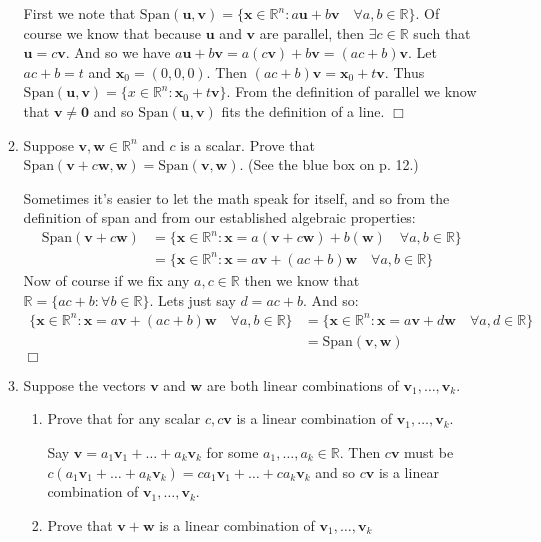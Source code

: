\documentclass[letterpaper]{article}
\begin{document}
\begin{enumerate}
\begin{enumerate}
  First we note that $\text{Span}(\mathbf{u},\mathbf{v})=\{\mathbf{x}\in \mathbb{R}^n:a\mathbf{u}+b\mathbf{v}\quad\forall a,b\in \mathbb{R}\}$.
  Of course we know that because $\mathbf{u}$ and $\mathbf{v}$ are parallel, then $\exists c\in \mathbb{R}$ such that $\mathbf{u}=c\mathbf{v}$.
  And so we have $a\mathbf{u}+b\mathbf{v}=a(c\mathbf{v})+b\mathbf{v}=(ac+b)\mathbf{v}$.
  Let $ac+b=t$ and $\mathbf{x}_0=(0,0,0)$.
  Then $(ac+b)\mathbf{v}=\mathbf{x}_0+t\mathbf{v}$.
  Thus $\text{Span}(\mathbf{u},\mathbf{v})=\{x\in \mathbb{R}^n:\mathbf{x}_0+t\mathbf{v}\}$.
  From the definition of parallel we know that $\mathbf{v}\ne \mathbf{0}$ and so $\text{Span}(\mathbf{u},\mathbf{v})$ fits the definition of a line.
  $\Box$
  
  \item
  Suppose $\mathbf{v},\mathbf{w}\in \mathbb{R}^n$ and $c$ is a scalar. Prove that $\text{Span}(\mathbf{v}+c\mathbf{w},\mathbf{w})=\text{Span}(\mathbf{v},\mathbf{w})$. (See the blue box on p. 12.)

  Sometimes it's easier to let the math speak for itself, and so from the definition of span and from our established algebraic properties:
  \begin{align*}
    \text{Span}(\mathbf{v}+c\mathbf{w})&=\{\mathbf{x}\in \mathbb{R}^n:\mathbf{x}=a(\mathbf{v}+c\mathbf{w})+b(\mathbf{w})\quad \forall a,b\in \mathbb{R}\}\\
    &=\{\mathbf{x}\in \mathbb{R}^n:\mathbf{x}=a\mathbf{v}+(ac+b)\mathbf{w}\quad \forall a,b\in \mathbb{R}\}
  \end{align*}
  Now of course if we fix any $a,c \in \mathbb{R}$ then we know that $\mathbb{R}=\{ac+b:\forall b\in \mathbb{R} \}$.
  Lets just say $d=ac+b$.
  And so:
  \begin{align*}
    \{\mathbf{x}\in \mathbb{R}^n:\mathbf{x}=a\mathbf{v}+(ac+b)\mathbf{w}\quad \forall a,b\in \mathbb{R}\}&=\{\mathbf{x}\in \mathbb{R}^n:\mathbf{x}=a\mathbf{v}+d\mathbf{w}\quad \forall a,d\in \mathbb{R}\}\\
    &=\text{Span}(\mathbf{v},\mathbf{w})
  \end{align*}
  $\Box$
  \item
  Suppose  the vectors $\mathbf{v}$ and $\mathbf{w}$ are both linear combinations of $\mathbf{v}_1,\dots,\mathbf{v}_k$.
    \begin{enumerate}
    \item
    Prove that for any scalar $c,c\mathbf{v}$ is a linear combination of $\mathbf{v}_1,\dots,\mathbf{v}_k$.

    Say $\mathbf{v}=a_1\mathbf{v}_1+\dots+a_k\mathbf{v}_k$ for some $a_1,\dots,a_k\in \mathbb{R}$. Then $c\mathbf{v}$ must be $c(a_1\mathbf{v}_1+\dots+a_k\mathbf{v}_k)=ca_1\mathbf{v}_1+\dots+ca_k\mathbf{v}_k$ and so $c\mathbf{v}$ is a linear combination of $\mathbf{v}_1,\dots,\mathbf{v}_k$.
    \item
    Prove that $\mathbf{v}+\mathbf{w}$ is a linear combination of $\mathbf{v}_1,\dots,\mathbf{v}_k$


\end{enumerate}
\end{enumerate}
\end{enumerate}
\end{document}
